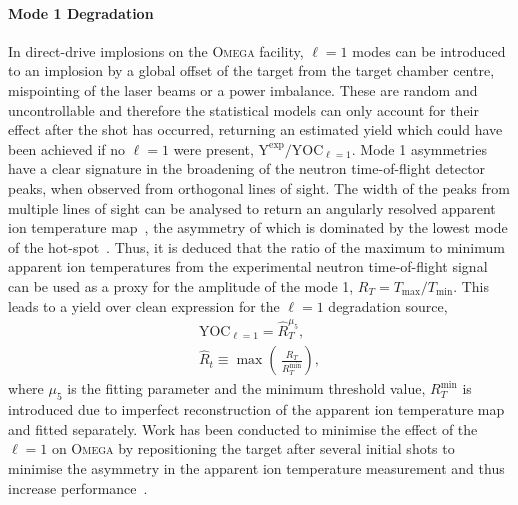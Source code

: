 \paragraph*{Mode 1 Degradation}
In direct-drive implosions on the \textsc{Omega} facility, $\ell=1$ modes can be introduced to an implosion by a global offset of the target from the target chamber centre, mispointing of the laser beams or a power imbalance.
These are random and uncontrollable and therefore the statistical models can only account for their effect after the shot has occurred, returning an estimated yield which could have been achieved if no $\ell=1$ were present, $\text{Y}^{\text{exp}}/\text{YOC}_{\ell=1}$.
Mode 1 asymmetries have a clear signature in the broadening of the neutron time-of-flight detector peaks, when observed from orthogonal lines of sight.
The width of the peaks from multiple lines of sight can be analysed to return an angularly resolved apparent ion temperature map~\cite{mannion_mitigation_2021}, the asymmetry of which is dominated by the lowest mode of the hot-spot~\cite{woo_inferring_2020}.
Thus, it is deduced that the ratio of the maximum to minimum apparent ion temperatures from the experimental neutron time-of-flight signal can be used as a proxy for the amplitude of the mode 1, $R_T = T_{\text{max}}/T_{\text{min}}$.
This leads to a yield over clean expression for the $\ell=1$ degradation source,
\begin{equation}
    \begin{gathered}
        \text{YOC}_{\ell=1} = \hat{R}_T^{\mu_5}, \\
        \hat{R}_t \equiv \max \left( \, \frac{R_T}{R_T^{\text{min}}} \right),
    \end{gathered}
\end{equation}
where $\mu_5$ is the fitting parameter and the minimum threshold value, $R_T^{\text{min}}$ is introduced due to imperfect reconstruction of the apparent ion temperature map and fitted separately.
Work has been conducted to minimise the effect of the $\ell=1$ on \textsc{Omega} by repositioning the target after several initial shots to minimise the asymmetry in the apparent ion temperature measurement and thus increase performance~\cite{mannion_mitigation_2021}.

